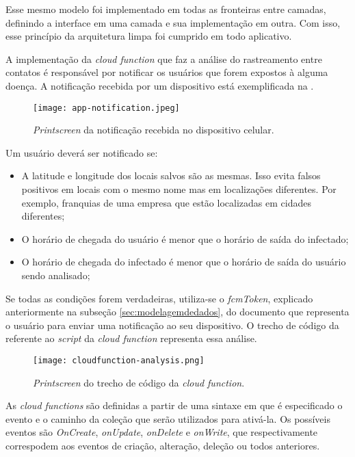 Esse mesmo modelo foi implementado em todas as fronteiras entre camadas, definindo a interface em uma camada e sua implementação em outra. Com isso, esse princípio da arquitetura limpa foi cumprido em todo aplicativo.

A implementação da \textit{cloud function} que faz a análise do rastreamento entre contatos é responsável por notificar os usuários que forem expostos à alguma doença. A notificação recebida por um dispositivo está exemplificada na .

\begin{figure}[!htb]
  \centering
  \texttt{[image: app-notification.jpeg]}
  \caption{\textit{Printscreen} da notificação recebida no dispositivo celular.}
  \label{fig:appnotification}
\end{figure}

Um usuário deverá ser notificado se:

\begin{itemize}
  \item A latitude e longitude dos locais salvos são as mesmas. Isso evita falsos positivos em locais com o mesmo nome mas em localizações diferentes. Por exemplo, franquias de uma empresa que estão localizadas em cidades diferentes;
  \item O horário de chegada do usuário é menor que o horário de saída do infectado;
  \item O horário de chegada do infectado é menor que o horário de saída do usuário sendo analisado;
\end{itemize}

Se todas as condições forem verdadeiras, utiliza-se o \textit{fcmToken}, explicado anteriormente na subseção \ref{sec:modelagemdedados}, do documento que representa o usuário para enviar uma notificação ao seu dispositivo. O trecho de código da  referente ao \textit{script} da \textit{cloud function} representa essa análise.

\begin{figure}[!htb]
  \centering
  \texttt{[image: cloudfunction-analysis.png]}
  \caption{\textit{Printscreen} do trecho de código da \textit{cloud function}.}
  \label{fig:cfscript}
\end{figure}

As \textit{cloud functions} são definidas a partir de uma sintaxe em que é especificado o evento e o caminho da coleção que serão utilizados para ativá-la. Os possíveis eventos são \textit{OnCreate}, \textit{onUpdate}, \textit{onDelete} e \textit{onWrite}, que respectivamente correspodem aos eventos de criação, alteração, deleção ou todos anteriores.

